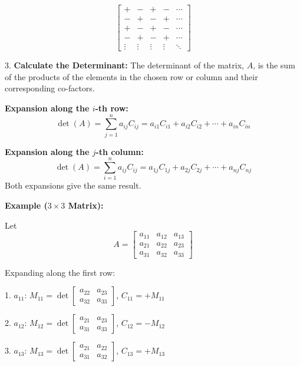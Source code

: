         \[
            \begin{bmatrix}
            + & - & + & - & \cdots \\
            - & + & - & + & \cdots \\
            + & - & + & - & \cdots \\
            - & + & - & + & \cdots \\
            \vdots & \vdots & \vdots & \vdots & \ddots
            \end{bmatrix}
        \]

 3.\textbf{ Calculate the Determinant:} The determinant of the matrix, \(A\), is the sum of 
 the products of the elements in the chosen row or column and their corresponding co-factors.

    \textbf{Expansion along the \(i\)-th row:}
        \[
            \det(A) = \sum_{j=1}^{n} a_{ij} C_{ij} = a_{i1}C_{i1} + a_{i2}C_{i2} + \cdots + a_{in}C_{in}
        \]

    \textbf{Expansion along the \(j\)-th column:}
        \[
            \det(A) = \sum_{i=1}^{n} a_{ij} C_{ij} = a_{1j}C_{1j} + a_{2j}C_{2j} + \cdots + a_{nj}C_{nj}
        \]
        Both expansions give the same result.

\textbf{Example (\(3\times3\) Matrix):}

Let
\[
    A = \begin{bmatrix}
    a_{11} & a_{12} & a_{13} \\
    a_{21} & a_{22} & a_{23} \\
    a_{31} & a_{32} & a_{33}
    \end{bmatrix}
\]

Expanding along the first row:

1. \(a_{11}\):  \(M_{11} = \det \begin{bmatrix} a_{22} & a_{23} \\ a_{32} & a_{33} \end{bmatrix}\),  \(C_{11} = +M_{11}\)

2. \(a_{12}\):  \(M_{12} = \det \begin{bmatrix} a_{21} & a_{23} \\ a_{31} & a_{33} \end{bmatrix}\),  \(C_{12} = -M_{12}\)

3. \(a_{13}\):  \(M_{13} = \det \begin{bmatrix} a_{21} & a_{22} \\ a_{31} & a_{32} \end{bmatrix}\),  \(C_{13} = +M_{13}\)

